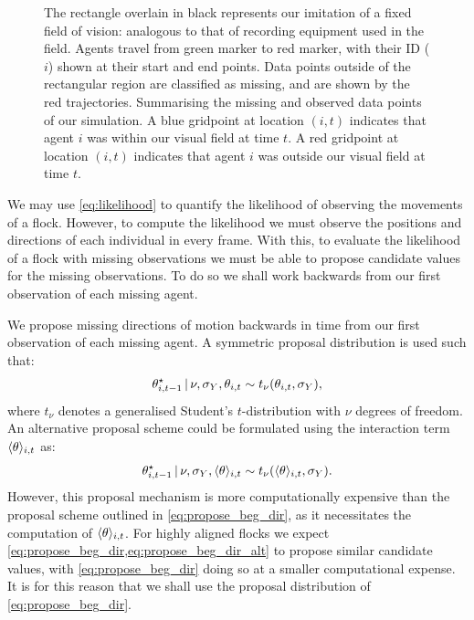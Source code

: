 \begin{figure}[tbp]
{    The rectangle overlain in black represents our imitation of a fixed
    field of vision: analogous to that of recording equipment used in the
    field. Agents travel from green marker to red marker, with their ID ($i$)
    shown at their start and end points. Data points outside of the rectangular
    region are classified as missing, and are shown by the red trajectories.
     Summarising the missing and observed data
    points of our simulation. A blue gridpoint at location $(i, t)$ indicates
    that agent $i$ was within our visual field at time $t$. A red gridpoint at
    location $(i, t)$ indicates that agent $i$ was outside our visual field
    at time $t$.}
  \label{fig:beg_data}
\end{figure}

We may use \cref{eq:likelihood} to quantify the likelihood of observing the
movements of a flock. However, to compute the likelihood we must observe the
positions and directions of each individual in every frame. With this, to
evaluate the likelihood of a flock with missing observations we must be able to
propose candidate values for the missing observations. To do so we shall work
backwards from our first observation of each missing agent.

We propose missing directions of motion backwards in time from our first
observation of each missing agent. A symmetric proposal distribution is used
such that:
\begin{equation}
  \label{eq:propose_beg_dir}
  \theta_{i,t-1}^{\star} \,|\, \nu, \sigma_Y, \theta_{i,t}
    \sim t_{\nu}(\theta_{i,t}, \sigma_Y),
\end{equation}
where $t_{\nu}$ denotes a generalised Student's $t$-distribution with $\nu$
degrees of freedom. An alternative proposal scheme could be formulated using
the interaction term $\langle\theta\rangle_{i,t}$ as:
\begin{equation}
  \label{eq:propose_beg_dir_alt}
  \theta_{i,t-1}^{\star} \,|\, \nu, \sigma_Y, \langle\theta\rangle_{i,t}
    \sim t_{\nu}(\langle\theta\rangle_{i,t}, \sigma_Y).
\end{equation}
However, this proposal mechanism is more computationally expensive than the
proposal scheme outlined in \cref{eq:propose_beg_dir}, as it necessitates the
computation of $\langle\theta\rangle_{i,t}$. For highly aligned flocks we expect
\cref{eq:propose_beg_dir,eq:propose_beg_dir_alt} to propose similar candidate
values, with \cref{eq:propose_beg_dir} doing so at a smaller computational
expense. It is for this reason that we shall use the proposal distribution of
\cref{eq:propose_beg_dir}.

